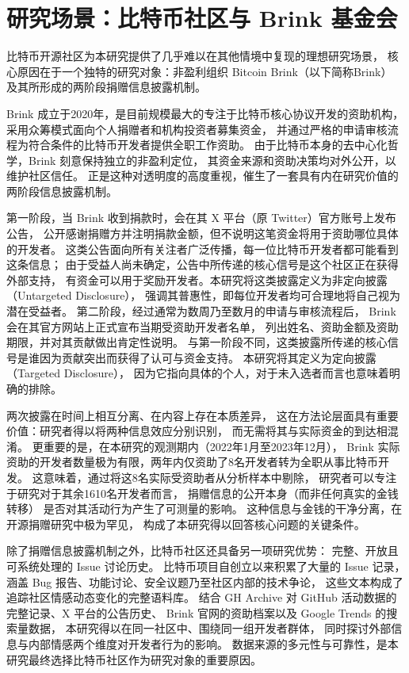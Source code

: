 \documentclass[
    type = master, %
    degree = professional,        %
    decl-page,  %
    twoside,                %
    fontset = fandol %
  ]{njuthesis}
\begin{document}
\section{研究场景：比特币社区与 Brink 基金会}

比特币开源社区为本研究提供了几乎难以在其他情境中复现的理想研究场景，
核心原因在于一个独特的研究对象：非盈利组织 Bitcoin Brink（以下简称Brink）
及其所形成的两阶段捐赠信息披露机制。

Brink 成立于2020年，是目前规模最大的专注于比特币核心协议开发的资助机构，
采用众筹模式面向个人捐赠者和机构投资者募集资金，
并通过严格的申请审核流程为符合条件的比特币开发者提供全职工作资助。
由于比特币本身的去中心化哲学，Brink 刻意保持独立的非盈利定位\cite{riehle2010economic}，
其资金来源和资助决策均对外公开，以维护社区信任。
正是这种对透明度的高度重视，催生了一套具有内在研究价值的两阶段信息披露机制。

第一阶段，当 Brink 收到捐款时，会在其 X 平台（原 Twitter）官方账号上发布公告，
公开感谢捐赠方并注明捐款金额，但不说明这笔资金将用于资助哪位具体的开发者。
这类公告面向所有关注者广泛传播，每一位比特币开发者都可能看到这条信息；
由于受益人尚未确定，公告中所传递的核心信号是这个社区正在获得外部支持，
有资金可以用于奖励开发者。本研究将这类披露定义为非定向披露（Untargeted Disclosure），
强调其普惠性，即每位开发者均可合理地将自己视为潜在受益者。
第二阶段，经过通常为数周乃至数月的申请与审核流程后，
Brink 会在其官方网站上正式宣布当期受资助开发者名单，
列出姓名、资助金额及资助期限，并对其贡献做出肯定性说明。
与第一阶段不同，这类披露所传递的核心信号是谁因为贡献突出而获得了认可与资金支持。
本研究将其定义为定向披露（Targeted Disclosure），
因为它指向具体的个人，对于未入选者而言也意味着明确的排除。

两次披露在时间上相互分离、在内容上存在本质差异，
这在方法论层面具有重要价值：研究者得以将两种信息效应分别识别，
而无需将其与实际资金的到达相混淆。
更重要的是，在本研究的观测期内（2022年1月至2023年12月），
Brink 实际资助的开发者数量极为有限，两年内仅资助了8名开发者转为全职从事比特币开发。
这意味着，通过将这8名实际受资助者从分析样本中剔除，
研究者可以专注于研究对于其余1610名开发者而言，
捐赠信息的公开本身（而非任何真实的金钱转移）
是否对其活动行为产生了可测量的影响。
这种信息与金钱的干净分离，在开源捐赠研究中极为罕见，
构成了本研究得以回答核心问题的关键条件。

除了捐赠信息披露机制之外，比特币社区还具备另一项研究优势：
完整、开放且可系统处理的 Issue 讨论历史。
比特币项目自创立以来积累了大量的 Issue 记录，
涵盖 Bug 报告、功能讨论、安全议题乃至社区内部的技术争论，
这些文本构成了追踪社区情感动态变化的完整语料库。
结合 GH Archive 对 GitHub 活动数据的完整记录、X 平台的公告历史、
Brink 官网的资助档案以及 Google Trends 的搜索量数据，
本研究得以在同一社区中、围绕同一组开发者群体，
同时探讨外部信息与内部情感两个维度对开发者行为的影响。
数据来源的多元性与可靠性，是本研究最终选择比特币社区作为研究对象的重要原因。
\end{document}
